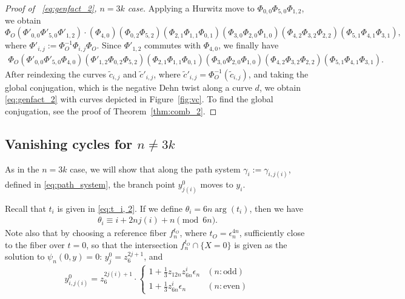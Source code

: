 \documentclass[10pt,a4paper,reqno]{amsart}
\theoremstyle{definition}
\numberwithin{equation}{section}
\numberwithin{figure}{section}
\newcommand{\ep}{\epsilon}
\begin{document}
\begin{proof}[Proof of ~\eqref{eq:genfact_2}, $n=3k$ case]
Applying a Hurwitz move to $\Phi_{0,0}\Phi_{5,0} \Phi_{1,2}$, we obtain 
\[\Phi_O (\Phi'_{0,0}\Phi'_{5,0} \Phi'_{1,2}) \cdot (\Phi_{4,0})( \Phi_{0,2}\Phi_{5,2})(\Phi_{2,1}\Phi_{1,1}\Phi_{0,1})(\Phi_{3,0} \Phi_{2,0}\Phi_{1,0} )
(\Phi_{4,2} \Phi_{3,2} \Phi_{2,2})(\Phi_{5,1}\Phi_{4,1}\Phi_{3,1}),\]
where $\Phi'_{i,j}:=\Phi_O^{-1} \Phi_{i,j}\Phi_O$.
Since $\Phi'_{1,2}$ commutes with $\Phi_{4,0}$, we finally have
\begin{align}
\Phi_O (\Phi'_{0,0}\Phi'_{5,0} \Phi_{4,0})(\Phi'_{1,2} \Phi_{0,2}\Phi_{5,2})(\Phi_{2,1}\Phi_{1,1}\Phi_{0,1})(\Phi_{3,0} \Phi_{2,0}\Phi_{1,0} )
(\Phi_{4,2} \Phi_{3,2} \Phi_{2,2})(\Phi_{5,1}\Phi_{4,1}\Phi_{3,1}).
\end{align}
After reindexing the curves $\tilde{c}_{i,j}$ and $\tilde{c}'_{i,j}$, where $\tilde{c}'_{i,j}=\Phi_O^{-1}(\tilde{c}_{i,j})$, and 
taking the global conjugation, which is the negative Dehn twist along a curve $d$, we obtain \eqref{eq:genfact_2} with curves depicted in Figure~\ref{fig:vc}.
To find the global conjugation, see the proof of Theorem~\ref{thm:comb_2}.
\end{proof}

\subsection{Vanishing cycles for $n\neq 3k$}
As in the $n=3k$ case, we will show that along the path system $\gamma_i:=\gamma_{i, j(i)}$, defined in \eqref{eq:path_system}, 
the branch point $y_{j(i)}^0$ moves to $y_{i}$.

Recall that $t_i$ is given in \eqref{eq:t_i, 2}.
If we define $\theta_i=6n\arg(t_i)$, then we have 
\begin{align} \label{eq:arg_t_i}
\theta_i\equiv i+2nj(i)+n \pmod{6n}.
\end{align}
Note also that by choosing a reference fiber $f_n^{t_O}$, where $t_O={\ep_n^{4n}}$, sufficiently close to the fiber over $t=0$, 
so that the intersection $f_n^{t_O}\cap \{X=0\}$ is given as the solution to $\psi_n(0,y)=0$:
$y_j^0=z_6^{2j+1}$, and 
\[y_{i,j(i)}^0=z_6^{2j(i)+1} \cdot 
\begin{cases} 1+\frac{1}{3} z_{12n}z_{6n}^i {\ep_n} & (n: \text{odd}) \\ 1+\frac{1}{3}z_{6n}^i {\ep_n} & (n: \text{even}) 
\end{cases}\]
\end{document}
